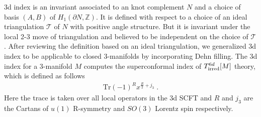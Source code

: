 \documentclass[a4paper,11pt]{article}
\def\cT{\mathcal{T}}
\begin{document}
3d index \cite{Dimofte:2011py} is an invariant associated to an knot complement $N$ and a choice of  basis $(A,B)$ of $H_1(\partial N, \mathbb{Z})$. It is defined with respect to a choice of an ideal triangulation $\cT$ of $N$ with positive angle structure. But it is invariant under the local 2-3 move of triangulation and believed to be independent on the choice of $\cT$. After reviewing the definition based on an ideal triangulation, we generalized 3d index to be applicable to closed 3-manifolds by incorporating Dehn filling. The 3d index for a 3-manifold $M$ computes the superconformal index of $T^{6d}_{\rm irred}[M]$ theory, which is defined as follows
%
\begin{align}
\textrm{Tr}(-1)^{R} x^{\frac{R}2 + j_3}\;.
\end{align}
%
Here the trace is taken over all local operators in the 3d SCFT and $R$ and $j_3$ are the Cartans of $u(1)$ R-symmetry and  $SO(3)$ Lorentz spin respectively. 
\end{document}
